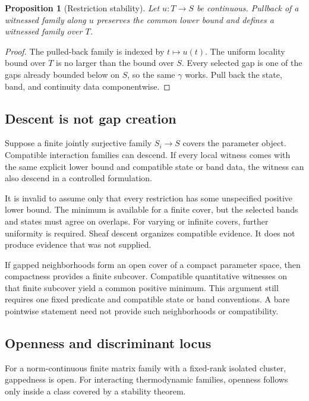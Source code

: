 \documentclass[12pt]{article}
\newtheorem{proposition}[theorem]{Proposition}
\theoremstyle{definition}
\theoremstyle{remark}
\begin{document}
\begin{proposition}[Restriction stability]
Let $u:T\to S$ be continuous. Pullback of a witnessed family along $u$
preserves the common lower bound and defines a witnessed family over $T$.
\end{proposition}

\begin{proof}
The pulled-back family is indexed by $t\mapsto u(t)$. The uniform locality
bound over $T$ is no larger than the bound over $S$. Every selected gap is one
of the gaps already bounded below on $S$, so the same $\gamma$ works. Pull back
the state, band, and continuity data componentwise.
\end{proof}

\subsection{Descent is not gap creation}

Suppose a finite jointly surjective family $S_i\to S$ covers the parameter
object. Compatible interaction families can descend. If every local witness
comes with the same explicit lower bound and compatible state or band data,
the witness can also descend in a controlled formulation.

It is invalid to assume only that every restriction has some unspecified
positive lower bound. The minimum is available for a finite cover, but the
selected bands and states must agree on overlaps. For varying or infinite
covers, further uniformity is required. Sheaf descent organizes compatible
evidence. It does not produce evidence that was not supplied.

If gapped neighborhoods form an open cover of a compact parameter space, then
compactness provides a finite subcover. Compatible quantitative witnesses on
that finite subcover yield a common positive minimum. This argument still
requires one fixed predicate and compatible state or band conventions. A bare
pointwise statement need not provide such neighborhoods or compatibility.

\subsection{Openness and discriminant locus}

For a norm-continuous finite matrix family with a fixed-rank isolated cluster,
gappedness is open. For interacting thermodynamic families, openness follows
only inside a class covered by a stability theorem.
\end{document}
